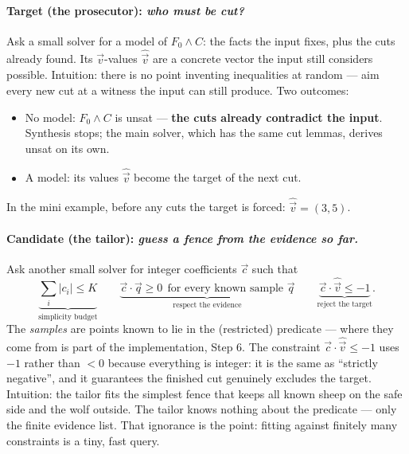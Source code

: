 \documentclass[11pt]{article}
\newcommand{\vv}{\ensuremath{\vec{v}}\xspace}
\newcommand{\vc}{\ensuremath{\vec{c}}\xspace}
\begin{document}
\paragraph{Target (the prosecutor): \emph{who must be cut?}}
Ask a small solver for a model of $F_0 \wedge C$: the facts the input
fixes, plus the cuts already found. Its $\vv$-values $\hat{\vv}$ are a
concrete vector the input still considers possible. Intuition: there is
no point inventing inequalities at random --- aim every new cut at a
witness the input can still produce. Two outcomes:
\begin{itemize}
\item No model: $F_0 \wedge C$ is \textsf{unsat} --- \textbf{the cuts
  already contradict the input}. Synthesis stops; the main solver, which
  has the same cut lemmas, derives \textsf{unsat} on its own.
\item A model: its values $\hat{\vv}$ become the target of the next cut.
\end{itemize}
In the mini example, before any cuts the target is forced:
$\hat{\vv} = (3,5)$.

\paragraph{Candidate (the tailor): \emph{guess a fence from the evidence
so far.}} Ask another small solver for integer coefficients $\vc$ such
that
\[
\underbrace{\textstyle\sum_i |c_i| \le K}_{\text{simplicity budget}}
\qquad
\underbrace{\vc \cdot \vec{q} \ge 0 \ \ \text{for every known sample } \vec{q}}_{\text{respect the evidence}}
\qquad
\underbrace{\vc \cdot \hat{\vv} \le -1}_{\text{reject the target}} .
\]
The \emph{samples} are points known to lie in the (restricted) predicate
--- where they come from is part of the implementation, Step 6. The
constraint $\vc \cdot \hat{\vv} \le -1$ uses $-1$ rather than $< 0$
because everything is integer: it is the same as ``strictly negative'',
and it guarantees the finished cut genuinely excludes the target.
Intuition: the tailor fits the simplest fence that keeps all known sheep
on the safe side and the wolf outside. The tailor knows nothing about the
predicate --- only the finite evidence list. That ignorance is the point:
fitting against finitely many constraints is a tiny, fast query.
\end{document}
